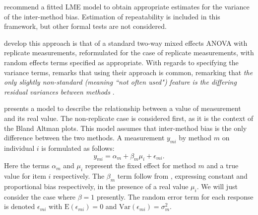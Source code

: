 \documentclass[12pt, a4paper]{report}
\theoremstyle{plain}
\theoremstyle{definition}
\theoremstyle{remark}
\begin{document}
\citet{BXC2008} recommend a fitted LME model to obtain appropriate estimates for the variance of the inter-method bias.  Estimation of repeatability is included in this framework, but other formal tests are not considered.



\citet{BXC2008} develop this approach is that of a standard two-way mixed effects ANOVA with replicate measurements, reformulated for the case of replicate measurements, with random effects terms specified as appropriate. With regards to specifying the variance terms, \citet{BXC2008} remarks that using their approach is common, remarking that \emph{the only slightly non-standard (meaning ``not often used") feature is the differing residual variances between methods }\citep{BXC2010}.





%

\citet{BXC2004} presents a model to describe the relationship between a value of measurement and its real value. The non-replicate case is considered first, as it is the context of the Bland Altman plots. This model assumes that inter-method bias is the only difference between the two methods. A measurement $y_{mi}$ by method $m$ on individual $i$ is formulated as follows:
\begin{equation}
y_{mi}  = \alpha_{m} + \beta_m\mu_{i} + \epsilon_{mi}.
\end{equation}
Here the terms $\alpha_{m}$ and $\mu_{i}$ represent the fixed effect for method $m$ and a true value for item $i$ respectively.  The $\beta_{m}$ term follow from \citet{DunnSEME}, expressing constant and proportional bias respectively, in the presence of a real value $\mu_{i}.$ We will just consider the case where $\beta=1$ presently. The random error term for each response is denoted $\epsilon_{mi}$ with $\mathrm{E}(\epsilon_{mi})=0$ and $\mathrm{Var}(\epsilon_{mi})=\sigma^2_m$.
 
\end{document}
